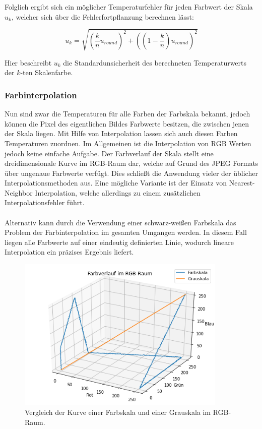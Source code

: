 \documentclass[10pt,a4paper,german]{article}
\begin{document}
Folglich ergibt sich ein möglicher Temperaturfehler für jeden Farbwert der Skala $u_k$, welcher sich über die Fehlerfortpflanzung berechnen lässt:

\begin{equation}
    u_k = \sqrt{\left(\frac{k}{n} u_{round} \right)^2 + \left(\left(1 - \frac{k}{n}\right) u_{round}\right)^2}
\end{equation}

Hier beschreibt $u_k$ die Standardunsicherheit des berechneten Temperaturwerts der $k$-ten Skalenfarbe.

\subsubsection{Farbinterpolation}
Nun sind zwar die Temperaturen für alle Farben der Farbskala bekannt, jedoch können die Pixel des eigentlichen Bildes Farbwerte besitzen, die zwischen jenen der Skala liegen.
Mit Hilfe von Interpolation lassen sich auch diesen Farben Temperaturen zuordnen.
Im Allgemeinen ist die Interpolation von RGB Werten jedoch keine einfache Aufgabe. 
Der Farbverlauf der Skala stellt eine dreidimensionale Kurve im RGB-Raum dar, welche auf Grund des JPEG Formats über ungenaue Farbwerte verfügt.
Dies schließt die Anwendung vieler der üblicher Interpolationsmethoden aus.
Eine mögliche Variante ist der Einsatz von Nearest-Neighbor Interpolation, welche allerdings zu einem zusätzlichen Interpolationsfehler führt.
\\
\\
Alternativ kann durch die Verwendung einer schwarz-weißen Farbskala das Problem der Farbinterpolation im gesamten Umgangen werden.
In diesem Fall liegen alle Farbwerte auf einer eindeutig definierten Linie, wodurch lineare Interpolation ein präzises Ergebnis liefert.

\begin{figure}[H]
    \centering
    \captionsetup{width=8cm}
    \includegraphics[width=10cm]{img/farb_vs_grau.png}
    \caption{Vergleich der Kurve einer Farbskala und einer Grauskala im RGB-Raum.}
\end{figure}
\end{document}
